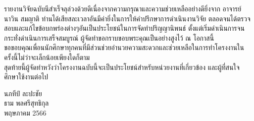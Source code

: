 รายงานวิจัยฉบับนีสำเร็จลุล่วงด้วยดีเนื่องจากความกรุณาและความช่วยเหลืออย่างดียิ่งจาก อาจารย์นาวิน สมญาติ ท่านได้เสียสละเวลาอันมีค่ายิ่งในการให้คำปรึกษาการดำเนินงานวิจัย ตลอดจนได้ตรวจสอบและแก้ไขข้อบกพร่องต่างๆอันเป็นประโยชน์ในการจัดทำปริญญานิพนธ์ ตั้งแต่เริ่มดำเนินการจนกระทั่งดำเนินการเสร็จสมบูรณ์ ผู้จัดทำขอกราบขอบพระคุณเป็นอย่างสูงไว้ ณ โอกาสนี้ \\
\indent ขอขอบคุณเพื่อนนักศึกษาทุกคนที่มีส่วนช่วยอำนวยความสะดวกและช่วยเหลือในการทำโครงงานในครั้งนี้ไม่ว่าจะเล็กน้อยเพียงใดก็ตาม \\
\indent สุดท้ายนี้ผู้จัดทำหวังว่าโครงงานฉบับนี้จะเป็นประโยชน์สำหรับหน่วยงานที่เกี่ยวข้อง และผู้ที่สนใจศึกษาใช้งานต่อไป \\

\begin{flushright}
นภทีป์ ละปะชัย \\
ธาม พลศรีสุทธิกุล \\
พฤษภาคม 2566
\end{flushright}




